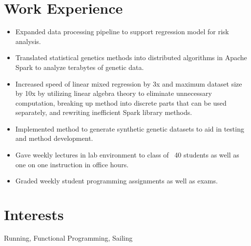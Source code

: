 \documentclass[12pt]{john_resume}
\begin{document}
\section{Work Experience}
\begin{itemize}
	\itemsep0em 
	\item Expanded data processing pipeline to support regression model for risk analysis. 
\end{itemize}
\begin{itemize}
	\itemsep0em 
	\item Translated statistical genetics methods into distributed algorithms in Apache Spark to analyze 
		terabytes of genetic data.
	\item Increased speed of linear mixed regression by 3x and maximum dataset size by 10x by utilizing 
		linear algebra theory to eliminate unnecessary computation, breaking up method into discrete parts 	
		that can be used separately, and rewriting inefficient Spark library methods. 
	\item Implemented method to generate synthetic genetic datasets to aid in testing and method 
		development.
\end{itemize}
\begin{itemize}
	\itemsep0em 
	\item Gave weekly lectures in lab environment to class of ~40 students as well as one on one instruction in office hours. 
	\item Graded weekly student programming assignments as well as exams.
\end{itemize}


\section{Interests}
Running, Functional Programming, Sailing
\end{document}
